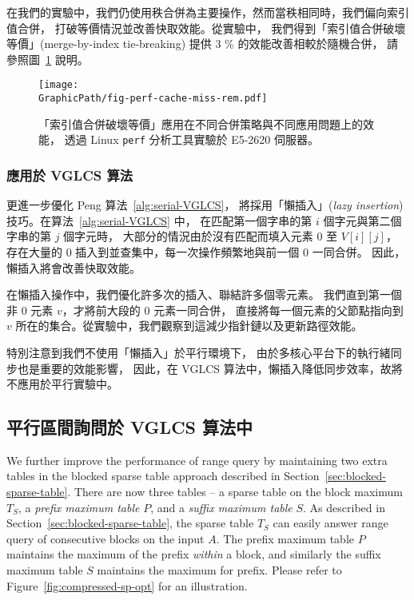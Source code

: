 在我們的實驗中，我們仍使用秩合併為主要操作，然而當秩相同時，我們偏向索引值合併，
打破等價情況並改善快取效能。從實驗中，
我們得到「索引值合併破壞等價」(merge-by-index tie-breaking) 提供 3 \% 的效能改善相較於隨機合併，
請參照圖~\ref{fig:fig-perf-cache-miss-rem} 說明。

\begin{figure}
  \centering
  \texttt{[image: \\GraphicPath/fig-perf-cache-miss-rem.pdf]}
  \caption{「索引值合併破壞等價」應用在不同合併策略與不同應用問題上的效能，
  透過 Linux {\tt perf} 分析工具實驗於 E5-2620 伺服器。}
  \label{fig:fig-perf-cache-miss-rem}
\end{figure}

\subsubsection{應用於 VGLCS 算法}


更進一步優化 Peng 算法~\ref{alg:serial-VGLCS}，
將採用「懶插入」({\em lazy insertion}) 技巧。在算法~\ref{alg:serial-VGLCS} 中，
在匹配第一個字串的第 $i$ 個字元與第二個字串的第 $j$ 個字元時，
大部分的情況由於沒有匹配而填入元素 $0$ 至 $V[i][j]$，
存在大量的 $0$ 插入到並查集中，每一次操作頻繁地與前一個 $0$ 一同合併。
因此，懶插入將會改善快取效能。

在懶插入操作中，我們優化許多次的插入、聯結許多個零元素。
我們直到第一個非 $0$ 元素 $v$，才將前大段的 $0$ 元素一同合併，
直接將每一個元素的父節點指向到 $v$ 所在的集合。從實驗中，我們觀察到這減少指針鏈以及更新路徑效能。

特別注意到我們不使用「懶插入」於平行環境下，
由於多核心平台下的執行緒同步也是重要的效能影響，
因此，在 VGLCS 算法中，懶插入降低同步效率，故將不應用於平行實驗中。

\subsection{平行區間詢問於 VGLCS 算法中}

We further improve the performance of range query by maintaining two
extra tables in the blocked sparse table approach described in
Section~\ref{sec:blocked-sparse-table}.  There are now three tables -- a
sparse table on the block maximum $T_S$, a {\em prefix maximum table}
$P$, and a {\em suffix maximum table} $S$.  As described in
Section~\ref{sec:blocked-sparse-table}, the sparse table $T_S$ can
easily answer range query of consecutive blocks on the input $A$.  The
prefix maximum table $P$ maintains the maximum of the prefix {\em
within} a block, and similarly the suffix maximum table $S$ maintains
the maximum for prefix.  Please refer to
Figure~\ref{fig:compressed-sp-opt} for an illustration.

